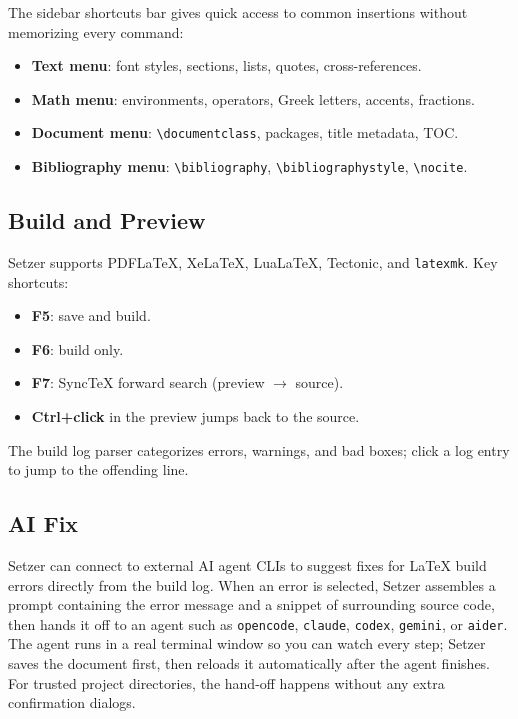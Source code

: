 \documentclass[11pt]{article}
\theoremstyle{definition}
\theoremstyle{plain}
\begin{document}
The sidebar shortcuts bar gives quick access to common insertions
without memorizing every command:
\begin{itemize}[noitemsep]
    \item \textbf{Text menu}: font styles, sections, lists, quotes,
          cross-references.
    \item \textbf{Math menu}: environments, operators, Greek letters,
          accents, fractions.
    \item \textbf{Document menu}: \texttt{\textbackslash documentclass},
          packages, title metadata, TOC.
    \item \textbf{Bibliography menu}: \texttt{\textbackslash bibliography},
          \texttt{\textbackslash bibliographystyle}, \texttt{\textbackslash nocite}.
\end{itemize}

\subsection{Build and Preview}
\label{sec:setzer:build}

Setzer supports PDFLaTeX, XeLaTeX, LuaLaTeX, Tectonic, and \texttt{latexmk}.
Key shortcuts:
\begin{itemize}[noitemsep]
    \item \textbf{F5}: save and build.
    \item \textbf{F6}: build only.
    \item \textbf{F7}: SyncTeX forward search (preview $\to$ source).
    \item \textbf{Ctrl+click} in the preview jumps back to the source.
\end{itemize}

The build log parser categorizes errors, warnings, and bad boxes;
click a log entry to jump to the offending line.

\subsection{AI Fix}
\label{sec:setzer:ai-fix}

Setzer can connect to external AI agent CLIs to suggest fixes for
\LaTeX{} build errors directly from the build log.
When an error is selected, Setzer assembles a prompt containing the
error message and a snippet of surrounding source code, then hands it
off to an agent such as \texttt{opencode}, \texttt{claude},
\texttt{codex}, \texttt{gemini}, or \texttt{aider}.
The agent runs in a real terminal window so you can watch every step;
Setzer saves the document first, then reloads it automatically after
the agent finishes.
For trusted project directories, the hand-off happens without any
extra confirmation dialogs.
\end{document}
